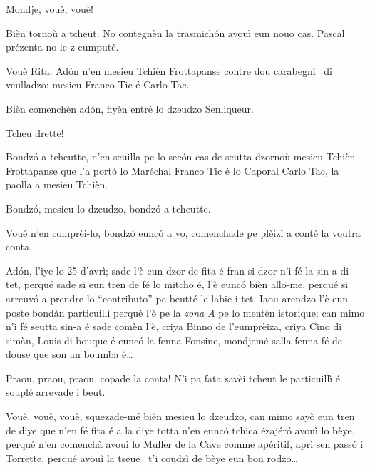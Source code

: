 \begin{drama}

 
\Ritaspeaks Mondje, vouè, vouè!


\Ritaspeaks Bièn tornoù a tcheut. No contegnèn la trasmichón avouì eun nouo cas. Pascal prézenta-no le-z-eumputé.

\Pascalspeaks Vouè Rita. Adón n'en mesieu Tchièn Frottapanse contre dou carabegnì \carabiniere\ di veulladzo: mesieu Franco Tic é Carlo Tac.


\Ritaspeaks Bièn comenchèn adón, fiyèn entré lo dzeudzo Senliqueur.


\Pascalspeaks Tcheu drette!


\DzeudzoSenliquerspeaks Bondzó a tcheutte, n'en seuilla pe lo secón cas de seutta dzornoù mesieu Tchièn Frottapanse que l'a portó lo Maréchal Franco Tic é lo Caporal Carlo Tac, la paolla a mesieu Tchièn.

\Cienspeaks Bondzó, mesieu lo dzeudzo, bondzó a tcheutte.

\DzeudzoSenliquerspeaks Voué n’en comprèi-lo, bondzó eunc\'o a vo, comenchade pe plèizì a conté la voutra conta.

\Cienspeaks Adón, l'iye lo 25 d’avrì; sade l'è eun dzor de fita é fran si dzor n’i fé la sin-a di tet, perqué sade si eun tren de fé lo mitcho é, l’è euncó bièn allo-me, perqué si arreuv\'o a prendre lo ``contributo'' pe beutté le labie i tet. Iaou arendzo l’è eun poste bondàn particuillì perqué l’è pe la \textit{zona A} pe lo mentèn istorique; can mimo n’i fé seutta sin-a é sade comèn l’è, criya Binno de l'eumprèiza, criya Cino di simàn, Louis di bouque é euncó la fenna Fonsine, mondjemé salla fenna fé de douse que son an boumba é\ldots

\DzeudzoSenliquerspeaks {} Praou, praou, praou, copade la conta! N’i pa fata savèi tcheut le particuillì é souplé arrevade i beut.

\Cienspeaks Vouè, vouè, vouè, squezade-mé bièn mesieu lo dzeudzo, can mimo sayò eun tren de diye que n’en fé fita é a la diye totta n’en eunc\'o tchica ézajéró avouì lo bèye, perqué n’en comenchà avouì lo Muller de la Cave comme apéritif, aprì sen passó i Torrette, perqué avouì la tseue \carne\ t’i coudzì de bèye eun bon rodzo\ldots


\end{drama}

